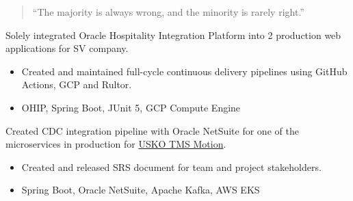 \documentclass[10pt,a4paper,normalphoto]{altacv}
\begin{document}
  \begin{paracol}{2}

    \begin{quote}
      ``The majority is always wrong, and the minority is rarely right.''
    \end{quote}

    Solely integrated Oracle Hospitality Integration Platform into 2 production
    web applications for SV company.
    \begin{itemize}
      \item Created and maintained full-cycle continuous delivery pipelines using GitHub Actions, GCP and Rultor.
      \item OHIP, Spring Boot, JUnit 5, GCP Compute Engine
    \end{itemize}
    Created CDC integration pipeline with Oracle NetSuite for one of the
    microservices in production for \href{https://motiontms.com}{USKO TMS Motion}.
    \begin{itemize}
      \item Created and released SRS document for team and project stakeholders.
      \item Spring Boot, Oracle NetSuite, Apache Kafka, AWS EKS
    \end{itemize}


\end{paracol}
\end{document}
